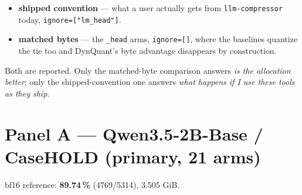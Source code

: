 \documentclass[11pt]{article}
\newcommand{\pct}{\,\%}
\newcommand{\code}[1]{\texttt{#1}}
\begin{document}
\begin{itemize}[leftmargin=1.4em]
\item \textbf{shipped convention} --- what a user actually gets from \code{llm-compressor} today,
\code{ignore=["lm\_head"]}.
\item \textbf{matched bytes} --- the \code{\_head} arms, \code{ignore=[]}, where the baselines
quantize the tie too and DynQuant's byte advantage disappears by construction.
\end{itemize}

Both are reported. Only the matched-byte comparison answers \emph{is the allocation better};
only the shipped-convention one answers \emph{what happens if I use these tools as they ship}.

\section{Panel A --- Qwen3.5-2B-Base / CaseHOLD (primary, 21 arms)}

bf16 reference: \textbf{89.74\pct} (4769/5314), 3.505 GiB.
\end{document}
